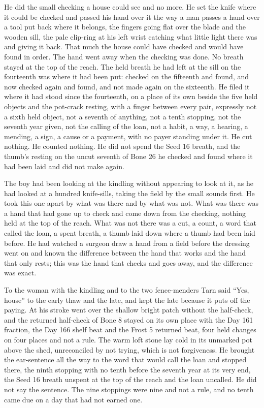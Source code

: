 He did the small checking a house could see and no more. He set the knife where it could be checked and passed his hand over it the way a man passes a hand over a tool put back where it belongs, the fingers going flat over the blade and the wooden sill, the pale clip-ring at his left wrist catching what little light there was and giving it back. That much the house could have checked and would have found in order. The hand went away when the checking was done. No breath stayed at the top of the reach. The held breath he had left at the sill on the fourteenth was where it had been put: checked on the fifteenth and found, and now checked again and found, and not made again on the sixteenth. He filed it where it had stood since the fourteenth, on a place of its own beside the five held objects and the pot-crack resting, with a finger between every pair, expressly not a sixth held object, not a seventh of anything, not a tenth stopping, not the seventh year given, not the calling of the loan, not a habit, a way, a hearing, a mending, a sign, a cause or a payment, with no payer standing under it. He cut nothing. He counted nothing. He did not spend the Seed 16 breath, and the thumb's resting on the uncut seventh of Bone 26 he checked and found where it had been laid and did not make again.

The boy had been looking at the kindling without appearing to look at it, as he had looked at a hundred knife-sills, taking the field by the small sounds first. He took this one apart by what was there and by what was not. What was there was a hand that had gone up to check and come down from the checking, nothing held at the top of the reach. What was not there was a cut, a count, a word that called the loan, a spent breath, a thumb laid down where a thumb had been laid before. He had watched a surgeon draw a hand from a field before the dressing went on and known the difference between the hand that works and the hand that only rests; this was the hand that checks and goes away, and the difference was exact.

To the woman with the kindling and to the two fence-menders Tarn said “Yes, house” to the early thaw and the late, and kept the late because it puts off the paying. At  his stroke went over the shallow bright patch without the half-check, and the returned half-check of Bone 8 stayed on its own place with the Day 161 fraction, the Day 166 shelf beat and the Frost 5 returned beat, four held changes on four places and not a rule. The warm loft stone lay cold in its unmarked pot above the shed, unreconciled by not trying, which is not forgiveness. He brought the ear-sentence all the way to the word that would call the loan and stopped there, the ninth stopping with no tenth before the seventh year at its very end, the Seed 16 breath unspent at the top of the reach and the loan uncalled. He did not say the sentence. The nine stoppings were nine and not a rule, and no tenth came due on a day that had not earned one.

